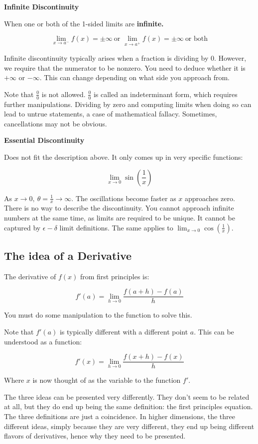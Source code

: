 \documentclass[
]{article}
\begin{document}
\textbf{Infinite Discontinuity}

When one or both of the 1-sided limits are \textbf{infinite.}

$$\lim_{x \rightarrow a^{-}}{f(x) = \pm \infty}\ \text{or\ }\lim_{x \rightarrow a^{+}}{f(x) = \pm \infty}\ \text{or\ both}$$

Infinite discontinuity typically arises when a fraction is dividing by
0. However, we require that the numerator to be nonzero. You need to
deduce whether it is $+ \infty$ or $- \infty$. This can change
depending on what side you approach from.

Note that $\frac{0}{0}$ is not allowed. $\frac{0}{0}$ is called an
indeterminant form, which requires further manipulations. Dividing by
zero and computing limits when doing so can lead to untrue statements, a
case of mathematical fallacy. Sometimes, cancellations may not be
obvious.

\textbf{Essential Discontinuity}

Does not fit the description above. It only comes up in very specific
functions:

$$\lim_{x \rightarrow 0}{\sin\left( \frac{1}{x} \right)}$$

As $x \rightarrow 0,\ \theta = \frac{1}{x} \rightarrow \infty$. The
oscillations become faster as $x$ approaches zero. There is no way to
describe the discontinuity. You cannot approach infinite numbers at the
same time, as limits are required to be unique. It cannot be captured by
$\epsilon - \delta$ limit definitions. The same applies to
$\lim_{x \rightarrow 0}{\cos\left( \frac{1}{x} \right)}$.


\subsection{The idea of a Derivative}

The derivative of $f(x)$ from first principles is:

$$f'(a) = \lim_{h \rightarrow 0}\frac{f(a + h) - f(a)}{h}$$

You must do some manipulation to the function to solve this.

Note that $f'(a)$ is typically different with a different point $a$.
This can be understood as a function:

$$f'(x) = \lim_{h \rightarrow 0}\frac{f(x + h) - f(x)}{h}$$

Where $x$ is now thought of as the variable to the function $f'$.

The three ideas can be presented very differently. They don't seem to be
related at all, but they do end up being the same definition: the first
principles equation. The three definitions are just a coincidence. In
higher dimensions, the three different ideas, simply because they are
very different, they end up being different flavors of derivatives,
hence why they need to be presented.
\end{document}
